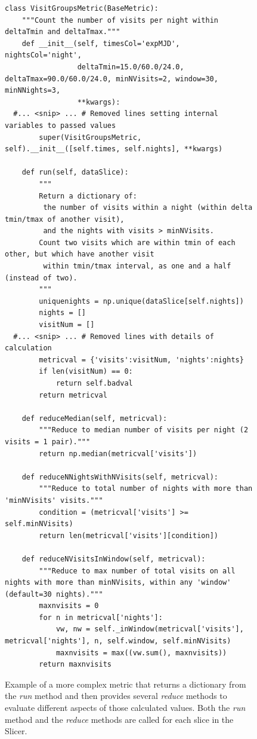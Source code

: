 \documentclass[]{spie}  %
\begin{document}
\begin{figure}
\begin{lstlisting}[frame=single]
class VisitGroupsMetric(BaseMetric):
    """Count the number of visits per night within deltaTmin and deltaTmax."""
    def __init__(self, timesCol='expMJD', nightsCol='night', 
                 deltaTmin=15.0/60.0/24.0, deltaTmax=90.0/60.0/24.0, minNVisits=2, window=30, minNNights=3,
                 **kwargs):
  #... <snip> ... # Removed lines setting internal variables to passed values
        super(VisitGroupsMetric, self).__init__([self.times, self.nights], **kwargs)

    def run(self, dataSlice):
        """
        Return a dictionary of:
         the number of visits within a night (within delta tmin/tmax of another visit),
         and the nights with visits > minNVisits.
        Count two visits which are within tmin of each other, but which have another visit
         within tmin/tmax interval, as one and a half (instead of two).
        """
        uniquenights = np.unique(dataSlice[self.nights])
        nights = []
        visitNum = []
  #... <snip> ... # Removed lines with details of calculation
        metricval = {'visits':visitNum, 'nights':nights}
        if len(visitNum) == 0:
            return self.badval
        return metricval
        
    def reduceMedian(self, metricval):
        """Reduce to median number of visits per night (2 visits = 1 pair)."""
        return np.median(metricval['visits'])
        
    def reduceNNightsWithNVisits(self, metricval):
        """Reduce to total number of nights with more than 'minNVisits' visits."""
        condition = (metricval['visits'] >= self.minNVisits)
        return len(metricval['visits'][condition])

    def reduceNVisitsInWindow(self, metricval):
        """Reduce to max number of total visits on all nights with more than minNVisits, within any 'window' (default=30 nights)."""
        maxnvisits = 0
        for n in metricval['nights']:
            vw, nw = self._inWindow(metricval['visits'], metricval['nights'], n, self.window, self.minNVisits)
            maxnvisits = max((vw.sum(), maxnvisits))
        return maxnvisits
\end{lstlisting}
\caption[]
{\label{fig:visitgroups} Example of a more complex metric that returns
a dictionary from the {\it run} method and then provides several {\it
  reduce} methods to evaluate different aspects of those calculated
values. Both the {\it run} method and the {\it reduce} methods are
called for each slice in the Slicer.}
\end{figure}
\end{document}
